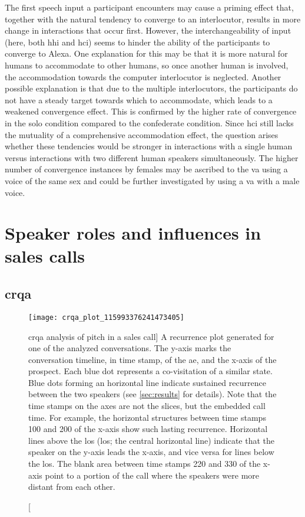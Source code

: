 The first speech input a participant encounters may cause a priming effect that, together with the natural tendency to converge to an interlocutor, results in more change in interactions that occur first.
However, the interchangeability of input (here, both \ac{hhi} and \ac{hci}) seems to hinder the ability of the participants to converge to Alexa.
One explanation for this may be that it is more natural for humans to accommodate to other humans, so once another human is involved, the accommodation towards the computer interlocutor is neglected.
Another possible explanation is that due to the multiple interlocutors, the participants do not have a steady target towards which to accommodate, which leads to a weakened convergence effect.
This is confirmed by the higher rate of convergence in the solo condition compared to the confederate condition.
Since \ac{hci} still lacks the mutuality of a comprehensive accommodation effect, the question arises whether these tendencies would be stronger in interactions with a single human versus interactions with two different human speakers simultaneously.
The higher number of convergence instances by females may be ascribed to the \ac{va} using a voice of the same sex and could be further investigated by using a \ac{va} with a male voice.

\section{Speaker roles and influences in sales calls}
\label{sec:speaker_roles_and_influences_in_sales_calls}

\subsection[\Acl{crqa} for measuring accommodation]{\Acl{crqa}}
\label{subsec:crqa}

\begin{figure}[t]
	\centering
	\texttt{[image: crqa\_plot\_115993376241473405]}
	\caption
	[\acs{crqa} analysis of pitch in a sales call]
	{A recurrence plot generated for one of the analyzed conversations.
		The y-axis marks the conversation timeline, in time stamp, of the \ac{ae}, and the x-axis of the prospect.
		Each blue dot represents a co-visitation of a similar state.
		Blue dots forming an horizontal line indicate sustained recurrence between the two speakers (see \cref{sec:results} for details).
		Note that the time stamps on the axes are not the slices, but the embedded call time. 
		For example, the horizontal structures between time stamps 100 and 200 of the x-axis show such lasting recurrence.
		Horizontal lines above the \acl{los} (\acs{los}; the central horizontal line) indicate that the speaker on the y-axis leads the x-axis, and vice versa for lines below the \ac{los}.
		The blank area between time stamps 220 and 330 of the x-axis point to a portion of the call where the speakers were more distant from each other.}
	\label{fig:crqa_plot}
\end{figure}

